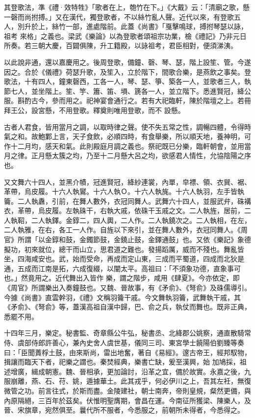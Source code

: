 \begin{pinyinscope}
 其登歌法，準《禮·效特牲》「歌者在上，匏竹在下。」《大戴》云：「清廟之歌，懸一磬而尚拊搏。」又在漢代，獨登歌者，不以絲竹亂人聲。近代以來，有登歌五人，別升於上，絲竹一部，進處階前。此蓋《尚書》「戛擊鳴球，搏拊琴瑟以詠，祖考
 來格」之義也。梁武《樂論》以為登歌者頌祖宗功業，檢《禮記》乃非元日所奏。若三朝大慶，百闢俱陳，升工籍殿，以詠祖考，君臣相對，便須涕洟。



 以此說非通，還以嘉慶用之。後周登歌，備鐘、磬、琴、瑟，階上設笙、管。今遂因之。合於《儀禮》荷瑟升歌，及笙入，立於階下，間歌合樂，是燕飲之事矣。登歌法，十有四人，鐘東磬西，工各一人，琴、瑟、箏、築各一人，並歌者三人，執節七人，並坐階上。笙、竽、簫、笛、塤、篪各一人，並立階下。悉進賢冠，絳公服。斟酌古今，參而用之。祀神宴會通行之。若有大祀臨軒，陳於階壇之上。若冊拜王公，設宮懸，不用登歌。釋奠則唯用登歌，而不
 設懸。



 古者人君食，皆用當月之調，以取時律之聲。使不失五常之性，調暢四體，令得時氣之和。故鮑鄴上言，天子食飲，必順四時，有食舉樂，所以順天地，養神明，可作十二月均，感天和氣。此則殿庭月調之義也。祭祀既已分樂，臨軒朝會，並用當月之律。正月懸太簇之均，乃至十二月懸大呂之均，欲感君人情性，允協陰陽之序也。



 又文舞六十四人，並黑介幘，冠進賢冠，絳紗連裳，內單，皁褾、領、衣巽、裾、革帶，烏皮履。十六人執鸑。十六人執Ｏ。十六人執旄。十六人執羽，左手皆執籥。二人執纛，引前，在舞人數外，衣冠同舞人。武舞六十四人，並服武弁，硃褠
 衣，革帶，烏皮履。左執硃干，右執大戚，依硃干玉戚之文。二人執旌，居前，二人執鞀，二人執鐸。金錞二，四人輿，二人作。二人執鐃次之。二人執相，在左，二人執雅，在右，各工一人作。自旌以下來引，並在舞人數外，衣冠同舞人。《周官》所謂「以金錞和鼓，金鐲節鼓，金鐃止鼓，金鐸通鼓」也。又依《樂記》象德擬功，初來就位，總干而山立，思君道之難也。發揚蹈厲，威而不殘也。舞亂皆坐，四海咸安也。武，始而受命，再成而定山東，三成而平蜀道，四成而北狄是通，五成而江南是拓，六成復綴，以闡太平。高祖曰：「不須象功德，直象事可也。」然竟用之。近代舞出入皆作
 樂，謂之階步，咸用《肆夏》。今亦依定，即《周官》所謂樂出入奏鐘鼓也。又魏、晉故事，有《矛俞》、《弩俞》及硃儒導引。今據《尚書》直雲幹羽，《禮》文稱羽籥干戚。今文舞執羽籥，武舞執干戚，其《矛俞》、《弩俞》等，蓋漢高祖自漢中歸，巴、俞之兵，執仗而舞也。既非正典，悉罷不用。



 十四年三月，樂定。秘書監、奇章縣公牛弘，秘書丞、北絳郡公姚察，通直散騎常侍、虞部侍郎許善心，兼內史舍人虞世基，儀同三司、東宮學士饒陽伯劉臻等奏曰：「臣聞蕢桴土鼓，由來斯尚，雷出地奮，著自《易經》。邃古帝王，經邦馭物，揖讓而臨天下者，祀樂之謂也。秦焚經典，樂書亡缺，爰至漢興，始
 加鳩採，祖述增廣，緝成朝憲。魏、晉相承，更加論討，沿革之宜，備於故實。永嘉之後，九服崩離，燕、石、苻、姚，遁據華土。此其戎乎，何必伊川之上，吾其左衽，無復微管之功。前言往式，於斯而盡。金陵建社，朝士南奔，帝則皇規，粲然更備，與內原隔絕，三百年於茲矣。伏惟明聖膺期，會昌在運。今南征所獲梁、陳樂人，及晉、宋旗章，宛然俱至。曩代所不服者，今悉服之，前朝所未得者，今悉得之。




\end{pinyinscope}
